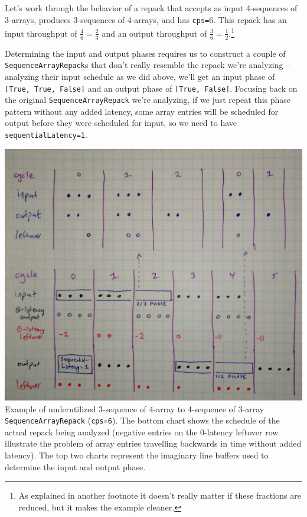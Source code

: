 \documentclass[12pt]{article}
\begin{document}
Let's work through the behavior of a repack that accepts as input
4-sequences of 3-arrays, produces 3-sequences of 4-arrays, and has
\texttt{cps=}6. This repack has an input throughput of
$\frac{4}{6} = \frac{2}{3}$
and an output throughput of $\frac{3}{6} = \frac{1}{2}$.\footnote{
As explained in another footnote it doesn't really matter if these
fractions are reduced, but it makes the example cleaner.
}

Determining the input and output phases requires us to construct a
couple of \texttt{SequenceArrayRepack}s that don't really resemble the
repack we're analyzing -- analyzing their input schedule as we did
above, we'll get an input phase of \texttt{[True, True, False]} and an
output phase of \texttt{[True, False]}. Focusing back on the original
\texttt{SequenceArrayRepack} we're analyzing, if we just repeat this
phase pattern without any added latency, some array entries will be
scheduled for output before they were scheduled for input, so we need
to have \texttt{sequentialLatency=1}.

\begin{center}
\includegraphics[width=1.0\linewidth]{Figures/underutil-repack.jpg}
Example of underutilized 3-sequence of 4-array to 4-sequence of
3-array \texttt{SequenceArrayRepack} (\texttt{cps=6}). The bottom
chart shows the schedule of the actual repack being analyzed (negative
entries on the 0-latency leftover row illustrate the problem of array
entries travelling backwards in time without added latency). The top
two charts represent the imaginary line buffers used to determine the
input and output phase.
\end{center}
\end{document}
